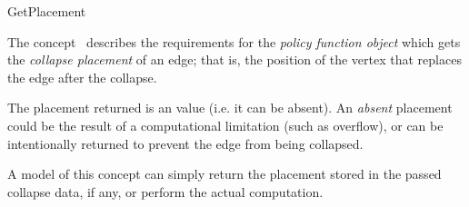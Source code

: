 
\begin{ccRefConcept}{GetPlacement}


\ccDefinition

The concept \ccRefName\ describes the requirements for the {\em policy function object} which gets the {\em collapse placement} of an edge; that is, the position of the vertex that replaces the edge after the collapse.

The placement returned is an  value (i.e. it can be absent). An {\em absent} placement could be the result of a computational limitation (such as overflow), or can be intentionally returned to prevent the edge from being collapsed.

A model of this concept can simply return the placement stored in the passed collapse data, if any, or perform the actual computation.

\ccRefines
{}

\ccTypes
\ccGlue    
\ccGlue    
\ccGlue    
\ccGlue    

\ccCreation
{}  %



\end{ccRefConcept}
